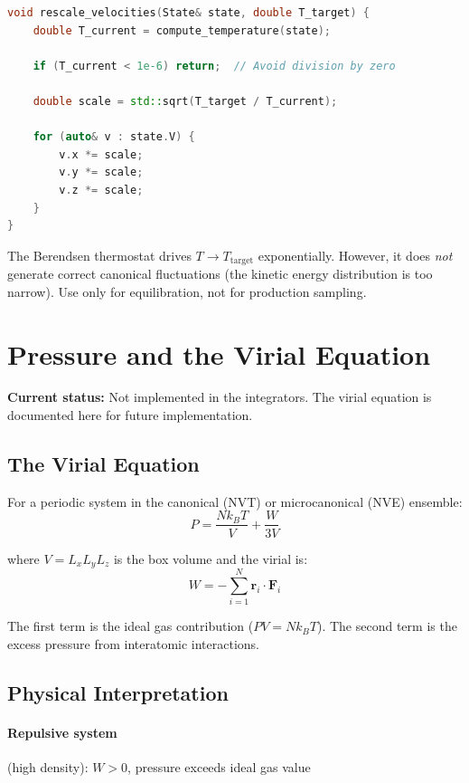 \documentclass[11pt]{article}
\begin{document}
\begin{lstlisting}[language=C++]
void rescale_velocities(State& state, double T_target) {
    double T_current = compute_temperature(state);
    
    if (T_current < 1e-6) return;  // Avoid division by zero
    
    double scale = std::sqrt(T_target / T_current);
    
    for (auto& v : state.V) {
        v.x *= scale;
        v.y *= scale;
        v.z *= scale;
    }
}
\end{lstlisting}

The Berendsen thermostat drives $T \to T_{\text{target}}$ exponentially. However, it does \textit{not} generate correct canonical fluctuations (the kinetic energy distribution is too narrow). Use only for equilibration, not for production sampling.

\section{Pressure and the Virial Equation}

\textbf{Current status:} Not implemented in the integrators. The virial equation is documented here for future implementation.

\subsection{The Virial Equation}

For a periodic system in the canonical (NVT) or microcanonical (NVE) ensemble:
\begin{equation}
P = \frac{N k_B T}{V} + \frac{W}{3V}
\end{equation}

where $V = L_x L_y L_z$ is the box volume and the virial is:
\begin{equation}
W = -\sum_{i=1}^{N} \mathbf{r}_i \cdot \mathbf{F}_i
\end{equation}

The first term is the ideal gas contribution ($PV = Nk_BT$). The second term is the excess pressure from interatomic interactions.

\subsection{Physical Interpretation}

\paragraph{Repulsive system} (high density): $W > 0$, pressure exceeds ideal gas value
\end{document}
